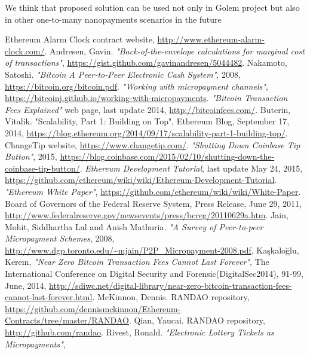 \documentclass[a4paper]{article}
\begin{document}
    We think that proposed solution can be used not only in Golem project but also in other one-to-many nanopayments
    scenarios in the future

\begin{thebibliography}{9}
 Ethereum Alarm Clock contract website, \url{http://www.ethereum-alarm-clock.com/}.
 Andresen, Gavin. \textit{"Back-of-the-envelope calculations for marginal cost of transactions"},
    \url{https://gist.github.com/gavinandresen/5044482}.
 Nakamoto, Satoshi. \textit{"Bitcoin A Peer-to-Peer Electronic Cash System"}, 2008,
    \url{https://bitcoin.org/bitcoin.pdf}.
 \textit{"Working with micropayment channels"},
    \url{https://bitcoinj.github.io/working-with-micropayments}.
 \textit{"Bitcoin Transaction Fees Explained"} web page, last update 2014, \url{http://bitcoinfees.com/}.
 Buterin, Vitalik. "Scalability, Part 1: Building on Top", Ethereum Blog, September 17, 2014,
    \url{https://blog.ethereum.org/2014/09/17/scalability-part-1-building-top/}.
 ChangeTip website, \url{https://www.changetip.com/}.
 \textit{"Shutting Down Coinbase Tip Button"}, 2015,
    \url{https://blog.coinbase.com/2015/02/10/shutting-down-the-coinbase-tip-button/}.
 \textit{Ethereum Development Tutorial}, last update May 24, 2015,
    \url{https://github.com/ethereum/wiki/wiki/Ethereum-Development-Tutorial}.
 \textit{"Ethereum White Paper"}, \url{https://github.com/ethereum/wiki/wiki/White-Paper}.
 Board of Governors of the Federal Reserve System, Press Release, June 29, 2011,
    \url{http://www.federalreserve.gov/newsevents/press/bcreg/20110629a.htm}.
 Jain, Mohit, Siddhartha Lal and Anish Mathuria. \textit{"A Survey of Peer-to-peer Micropayment Schemes},
    2008, \url{http://www.dgp.toronto.edu/~mjain/P2P_Micropayment-2008.pdf}.
Kaşkaloğlu, Kerem, \textit{"Near Zero Bitcoin Transaction Fees Cannot Last Forever"},
    The International Conference on Digital Security and Forensic(DigitalSec2014), 91-99, June, 2014,
    \url{http://sdiwc.net/digital-library/near-zero-bitcoin-transaction-fees-cannot-last-forever.html}.
 McKinnon, Dennis. RANDAO repository,
    \url{https://github.com/dennismckinnon/Ethereum-Contracts/tree/master/RANDAO}.
 Qian, Yaucai. RANDAO repository, \url{http://github.com/randao}.
 Rivest, Ronald. \textit{"Electronic Lottery Tickets as Micropayments"},

\end{thebibliography}
\end{document}
